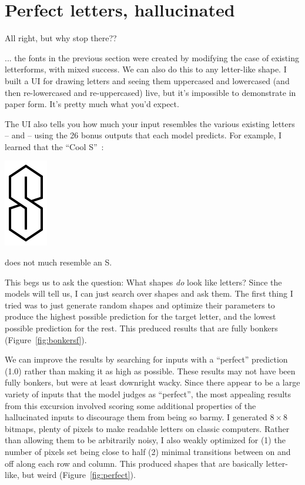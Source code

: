 \documentclass[twocolumn]{article}
\begin{document}
\section{Perfect letters, hallucinated} \label{sec:hallucination}


All right, but why stop there?? 

... the fonts in the previous section were created by modifying the
case of existing letterforms, with mixed success. We can also do this
to any letter-like shape. I built a UI for drawing letters and seeing
them uppercased and lowercased (and then re-lowercased and
re-uppercased) live, but it's impossible to demonstrate in paper
form. It's pretty much what you'd expect. 

The UI also tells you how much your input resembles the various
existing letters -- and
-- using the 26 bonus outputs that each
model predicts. For example, I learned that the ``Cool
S''~\cite{wikipediacools}:

\begin{center}
\includegraphics[width=0.1 \linewidth]{cools}
\end{center}

\noindent does not much resemble an S.

This begs us to ask the question: What shapes {\em do} look like
letters? Since the models will tell us, I can just search over shapes
and ask them. The first thing I tried was to just generate random
shapes and optimize their parameters to produce the highest possible
prediction for the target letter, and the lowest possible prediction
for the rest. This preduced results that are fully bonkers
(Figure~\ref{fig:bonkersf}). 

We can improve the results by searching for inputs with a ``perfect''
prediction (1.0) rather than making it as high as possible. These
results may not have been fully bonkers, but were at least downright
wacky. Since there appear to be a large variety of inputs that the
model judges as ``perfect'', the most appealing results from this
excursion involved scoring some additional properties of the
hallucinated inputs to discourage them from being so barmy. I
generated $8 \times 8$ bitmaps, plenty of pixels to make readable
letters on classic computers. Rather than allowing them to be
arbitrarily noisy, I also weakly optimized for (1) the number of
pixels set being close to half (2) minimal transitions between
on and off along each row and column. This produced shapes that
are basically letter-like, but weird (Figure~\ref{fig:perfect}).
\end{document}
